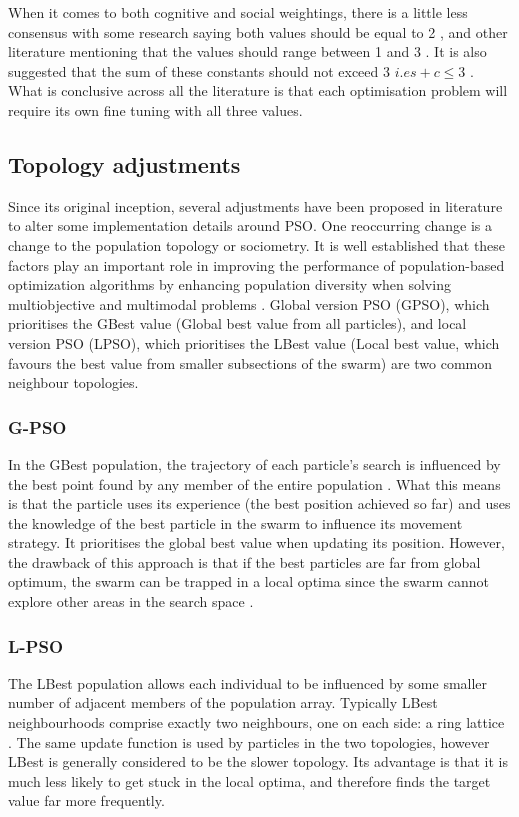 \documentclass[oneside,12pt]{book}
\begin{document}
When it comes to both cognitive and social weightings, there is a little less consensus with some research saying both values should be equal to 2 \cite{kennedy_eberhart_1995}, and other literature mentioning that the values should range between 1 and 3 \cite{ZHANG20143576}. It is also suggested that the sum of these constants should not exceed 3 \(i.e s+c \leq 3\) \cite{kan2012convergence}. What is conclusive across all the literature is that each optimisation problem will require its own fine tuning with all three values. 

\subsection{Topology adjustments}
Since its original inception, several adjustments have been proposed in literature to alter some implementation details around PSO. One reoccurring change is a change to the population topology or sociometry. It is well established that these factors play an important role in improving the performance of population-based optimization algorithms by enhancing population diversity when solving multiobjective and multimodal problems \cite{LYNN201824}. Global version PSO (GPSO), which prioritises the GBest value (Global best value from all particles), and local version PSO (LPSO), which prioritises the LBest value (Local best value, which favours the best value from smaller subsections of the swarm) are two common neighbour topologies. 

\subsubsection{G-PSO}
In the GBest population, the trajectory of each particle’s search is influenced by the best point found by any member of the entire population \cite{kennedy2002population}. What this means is that the particle uses its experience (the best position achieved so far) and uses the knowledge of the best particle in the swarm to influence its movement strategy. It prioritises the global best value when updating its position. However, the drawback of this approach is that if the best particles are far from global optimum, the swarm can be trapped in a local optima since the swarm cannot explore other areas in the search space \cite{azab_hady_hefny_2016}.

\subsubsection{L-PSO}
The LBest population allows each individual to be influenced by some smaller number of adjacent members of the population array. Typically LBest neighbourhoods comprise exactly two neighbours, one on each side: a ring lattice \cite{kennedy2002population}. The same update function is used by particles in the two topologies, however LBest is generally considered to be the slower topology. Its advantage is that it is much less likely to get stuck in the local optima, and therefore finds the target value far more frequently. 
\end{document}
